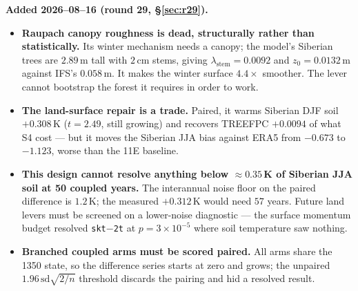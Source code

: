 \documentclass[10pt]{article}
\begin{document}
\textbf{Added 2026--08--16 (round 29, \S\ref{sec:r29}).}
\begin{itemize}\itemsep2pt
\item \textbf{Raupach canopy roughness is dead, structurally rather than statistically.}
Its winter mechanism needs a canopy; the model's Siberian trees are $2.89$\,m tall with
$2$\,cm stems, giving $\lambda_{\text{stem}}=0.0092$ and $z_0=0.0132$\,m against IFS's
$0.058$\,m. It makes the winter surface $4.4\times$ smoother. The lever cannot bootstrap
the forest it requires in order to work.
\item \textbf{The land-surface repair is a trade.} Paired, it warms Siberian DJF soil
$+0.308$\,K ($t=2.49$, still growing) and recovers TREEFPC $+0.0094$ of what S4 cost ---
but it moves the Siberian JJA bias against ERA5 from $-0.673$ to $-1.123$, worse than the
11E baseline.
\item \textbf{This design cannot resolve anything below ${\approx}0.35$\,K of Siberian
JJA soil at 50 coupled years.} The interannual noise floor on the paired difference is
$1.2$\,K; the measured $+0.312$\,K would need $57$ years. Future land levers must be
screened on a lower-noise diagnostic --- the surface momentum budget resolved
\texttt{skt}${-}$\texttt{2t} at $p=3\times10^{-5}$ where soil temperature saw nothing.
\item \textbf{Branched coupled arms must be scored paired.} All arms share the 1350
state, so the difference series starts at zero and grows; the unpaired
$1.96\,\mathrm{sd}\sqrt{2/n}$ threshold discards the pairing and hid a resolved result.
\end{itemize}
\end{document}
